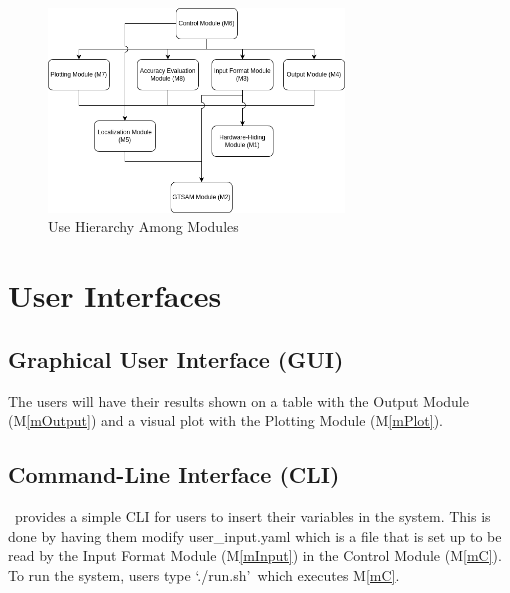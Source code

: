 \documentclass[12pt, titlepage]{article}
\begin{document}


\begin{figure}[H]
\centering
\includegraphics[width=0.7\textwidth]{UsesHierarchy.png}
\caption{Use Hierarchy Among Modules}
\label{FigUH}
\end{figure}


\section{User Interfaces}
\subsection{Graphical User Interface (GUI)}
The users will have their results shown on a table with the Output Module (M\ref{mOutput}) and a visual plot with the Plotting Module (M\ref{mPlot}).

\subsection{Command-Line Interface (CLI)}
\progname~provides a simple CLI for users to insert their variables in the system. This is done by having them modify user\_input.yaml which is a file that is set up to be read by the Input Format Module (M\ref{mInput}) in the Control Module (M\ref{mC}). To run the system, users type \lq./run.sh\rq~which executes M\ref{mC}.
\end{document}
